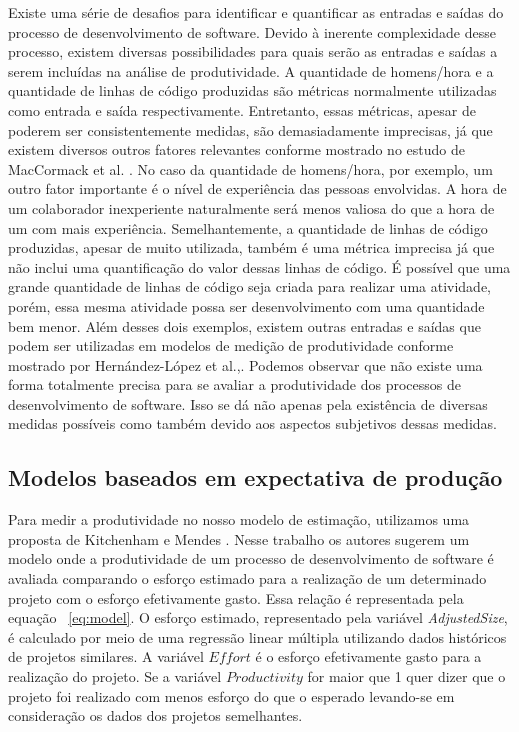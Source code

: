 Existe uma série de desafios para identificar e quantificar as entradas e saídas do processo de desenvolvimento de software. Devido à inerente complexidade desse processo, existem diversas possibilidades para quais serão as entradas e saídas a serem incluídas na análise de produtividade. A quantidade de homens/hora e a quantidade de linhas de código produzidas são métricas normalmente utilizadas como entrada e saída respectivamente.  Entretanto, essas métricas, apesar de poderem ser consistentemente medidas, são demasiadamente imprecisas, já que existem diversos outros fatores relevantes conforme mostrado no estudo de MacCormack et al. \cite{maccormack2003trade}. No caso da quantidade de homens/hora, por exemplo, um outro fator importante é o nível de experiência das pessoas envolvidas. A hora de um colaborador inexperiente naturalmente será menos valiosa do que a hora de um com mais experiência. Semelhantemente, a quantidade de linhas de código produzidas, apesar de muito utilizada, também é uma métrica imprecisa já que não inclui uma quantificação do valor dessas linhas de código.  É possível que uma grande quantidade de linhas de código seja criada para realizar uma atividade, porém, essa mesma atividade possa ser desenvolvimento com uma quantidade bem menor. Além desses dois exemplos, existem outras entradas e saídas que podem ser utilizadas em modelos de medição de produtividade conforme mostrado por Hernández-López et al.,\cite{hernandez2015productivity}. Podemos observar que não existe uma forma totalmente precisa para se avaliar a produtividade dos processos de desenvolvimento de software. Isso se dá não apenas pela existência de diversas medidas possíveis como também devido aos aspectos subjetivos dessas medidas. 

\subsection{Modelos baseados em expectativa de produção}

Para medir a produtividade no nosso modelo de estimação, utilizamos uma proposta de Kitchenham e Mendes \cite{kitchenham2004software}. Nesse trabalho os autores sugerem um modelo onde a produtividade de um processo de desenvolvimento de software é avaliada comparando o esforço estimado para a realização de um determinado projeto com o esforço efetivamente gasto. Essa relação é representada pela equação ~\ref{eq:model}. O esforço estimado, representado pela variável \textit{AdjustedSize}, é calculado por meio de uma regressão linear múltipla utilizando dados históricos de projetos similares. A variável $Effort$ é o esforço efetivamente gasto para a realização do projeto. Se a variável $Productivity$ for maior que 1 quer dizer que o projeto foi realizado com menos esforço do que o esperado levando-se em consideração os dados dos projetos semelhantes.
 
